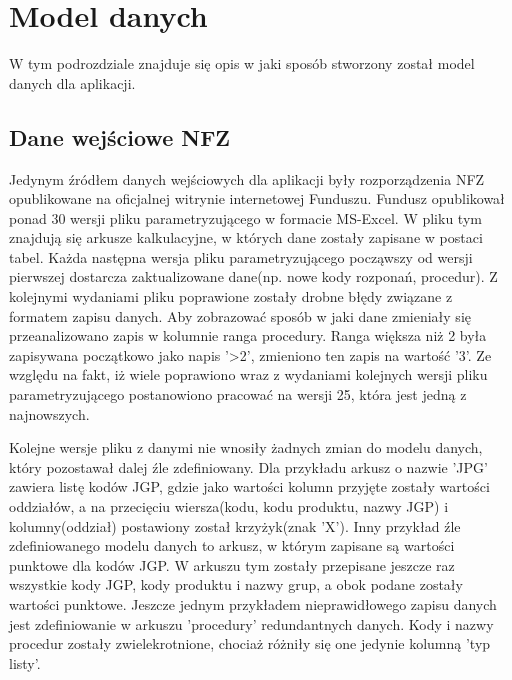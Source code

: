 \section{Model danych}
\label{sec:modelDanych}

W tym podrozdziale znajduje się opis w jaki sposób stworzony został model danych dla aplikacji.

\subsection{Dane wejściowe NFZ}
\label{sec:daneWejscioweNFZ}
Jedynym źródłem danych wejściowych dla aplikacji były rozporządzenia NFZ opublikowane na oficjalnej witrynie internetowej Funduszu\cite{rozporzadzenia_nfz}. Fundusz opublikował ponad 30 wersji pliku parametryzującego w formacie MS-Excel. W pliku tym znajdują się arkusze kalkulacyjne, w których dane zostały zapisane w postaci tabel. Każda następna wersja pliku parametryzującego począwszy od wersji pierwszej dostarcza zaktualizowane dane(np. nowe kody rozponań, procedur). Z kolejnymi wydaniami pliku poprawione zostały drobne błędy związane z formatem zapisu danych. Aby zobrazować sposób w jaki dane zmieniały się przeanalizowano zapis w kolumnie ranga procedury. Ranga większa niż 2 była zapisywana początkowo jako napis '>2', zmieniono ten zapis na wartość '3'. Ze względu na fakt, iż wiele poprawiono wraz z wydaniami kolejnych wersji pliku parametryzującego postanowiono pracować na wersji 25, która jest jedną z najnowszych. 

Kolejne wersje pliku z danymi nie wnosiły żadnych zmian do modelu danych, który pozostawał dalej źle zdefiniowany. Dla przykładu arkusz o nazwie 'JPG' zawiera listę kodów JGP, gdzie jako wartości kolumn przyjęte zostały wartości oddziałów, a na przecięciu wiersza(kodu, kodu produktu, nazwy JGP) i kolumny(oddział) postawiony został krzyżyk(znak 'X'). Inny przykład źle zdefiniowanego modelu danych to arkusz, w którym zapisane są wartości punktowe dla kodów JGP. W arkuszu tym zostały przepisane jeszcze raz wszystkie kody JGP, kody produktu i nazwy grup, a obok podane zostały wartości punktowe. Jeszcze jednym przykładem nieprawidłowego zapisu danych jest zdefiniowanie w arkuszu 'procedury' redundantnych danych. Kody i nazwy procedur zostały zwielekrotnione, chociaż różniły się one jedynie kolumną 'typ listy'.

